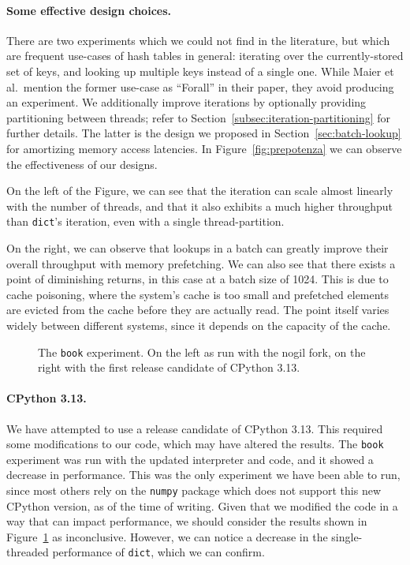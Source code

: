 \paragraph{Some effective design choices.}
There are two experiments which we could not find in the literature, but which are frequent use-cases of hash tables in general: iterating over the currently-stored set of keys, and looking up multiple keys instead of a single one.
While Maier et al.\ mention the former use-case as ``Forall'' in their paper, they avoid producing an experiment.
We additionally improve iterations by optionally providing partitioning between threads; refer to Section~\ref{subsec:iteration-partitioning} for further details.
The latter is the design we proposed in Section~\ref{sec:batch-lookup} for amortizing memory access latencies.
In Figure~\ref{fig:prepotenza} we can observe the effectiveness of our designs.

On the left of the Figure, we can see that the iteration can scale almost linearly with the number of threads, and that it also exhibits a much higher throughput than \texttt{dict}'s iteration, even with a single thread-partition.

On the right, we can observe that lookups in a batch can greatly improve their overall throughput with memory prefetching.
We can also see that there exists a point of diminishing returns, in this case at a batch size of 1024.
This is due to cache poisoning, where the system's cache is too small and prefetched elements are evicted from the cache before they are actually read.
The point itself varies widely between different systems, since it depends on the capacity of the cache.

\begin{figure}
    \begin{centering}
        \scalebox{0.4}{}%
        \scalebox{0.4}{}
        \caption{The \texttt{book} experiment. On the left as run with the nogil fork, on the right with the first release candidate of CPython 3.13.}
        \label{fig:book-3.13}
    \end{centering}
\end{figure}

\paragraph{CPython 3.13.}
We have attempted to use a release candidate of CPython 3.13.
This required some modifications to our code, which may have altered the results.
The \texttt{book} experiment was run with the updated interpreter and code, and it showed a decrease in performance.
This was the only experiment we have been able to run, since most others rely on the \texttt{numpy} package which does not support this new CPython version, as of the time of writing.
Given that we modified the code in a way that can impact performance, we should consider the results shown in Figure~\ref{fig:book-3.13} as inconclusive.
However, we can notice a decrease in the single-threaded performance of \texttt{dict}, which we can confirm.

